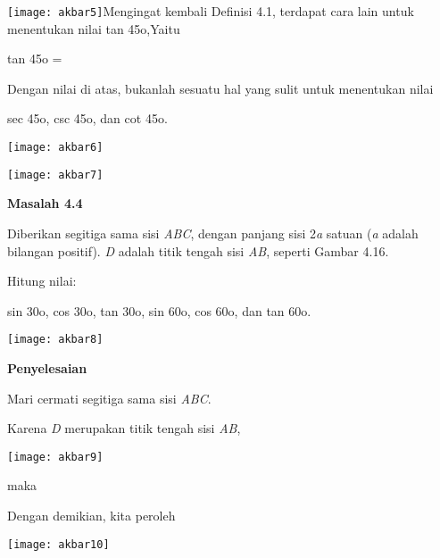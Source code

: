 \documentclass[11pt,fleqn]{book} %
\begin{document}
\begin{myEnumerate}
\begin{itemize}
\noindent \texttt{[image: akbar5]}Mengingat kembali Definisi 4.1, terdapat cara lain untuk menentukan nilai tan 45o,Yaitu

\noindent 

\noindent tan 45o = 

\noindent 

\noindent 

\noindent Dengan nilai di atas, bukanlah sesuatu hal yang sulit untuk menentukan nilai

\noindent sec 45o, csc 45o, dan cot 45o.

\noindent \texttt{[image: akbar6]}

\noindent 

\noindent \texttt{[image: akbar7]}

\noindent 

\noindent \textbf{Masalah 4.4 }

\noindent Diberikan segitiga sama sisi \textit{ABC}, dengan panjang sisi 2\textit{a }satuan (\textit{a }adalah bilangan positif). \textit{D }adalah titik tengah sisi \textit{AB}, seperti Gambar 4.16.\textbf{ }

\noindent Hitung nilai:\textbf{}

\noindent sin 30o, cos 30o, tan 30o, sin 60o, cos 60o, dan tan 60o.

\noindent 

\noindent \texttt{[image: akbar8]}

\noindent 

\noindent \textbf{Penyelesaian}

\noindent Mari cermati segitiga sama sisi \textit{ABC}.

\noindent Karena \textit{D }merupakan titik tengah sisi \textit{AB},

\noindent \texttt{[image: akbar9]}

\noindent maka 

\noindent 

\noindent Dengan demikian, kita peroleh

\noindent \texttt{[image: akbar10]}

\noindent 

\noindent 

 


\end{itemize}
\end{myEnumerate}
\end{document}
